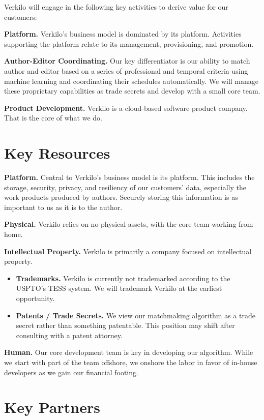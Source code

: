 \documentclass[10pt,openany]{book}
\providecommand{\tightlist}{%
  \setlength{\itemsep}{0pt}\setlength{\parskip}{0pt}}
\begin{document}
Verkilo will engage in the following key activities to derive value for
our customers:

\textbf{Platform.} Verkilo's business model is dominated by its
platform. Activities supporting the platform relate to its management,
provisioning, and promotion.

\textbf{Author-Editor Coordinating.} Our key differentiator is our
ability to match author and editor based on a series of professional and
temporal criteria using machine learning and coordinating their
schedules automatically. We will manage these proprietary capabilities
as trade secrets and develop with a small core team.

\textbf{Product Development.} Verkilo is a cloud-based software product
company. That is the core of what we do.

\hypertarget{key-resources}{%
\section{Key Resources}\label{key-resources}}

\textbf{Platform.} Central to Verkilo's business model is its platform.
This includes the storage, security, privacy, and resiliency of our
customers' data, especially the work products produced by authors.
Securely storing this information is as important to us as it is to the
author.

\textbf{Physical.} Verkilo relies on no physical assets, with the core
team working from home.

\textbf{Intellectual Property.} Verkilo is primarily a company focused
on intellectual property.

\begin{itemize}
\tightlist
\item
  \textbf{Trademarks.} Verkilo is currently not trademarked according to
  the USPTO's TESS system. We will trademark Verkilo at the earliest
  opportunity.
\item
  \textbf{Patents / Trade Secrets.} We view our matchmaking algorithm as
  a trade secret rather than something patentable. This position may
  shift after consulting with a patent attorney.
\end{itemize}

\textbf{Human.} Our core development team is key in developing our
algorithm. While we start with part of the team offshore, we onshore the
labor in favor of in-house developers as we gain our financial footing.

\hypertarget{key-partners}{%
\section{Key Partners}\label{key-partners}}
\end{document}
